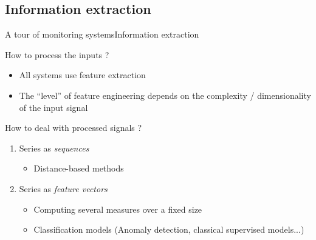 \documentclass[8pt,t,aspectratio=1610]{beamer}
\begin{document}
\subsection{Information extraction}
\begin{frame}{A tour of monitoring systems}{Information extraction}

    \begin{minipage}[t]{0.49\linewidth}
    \vspace{0pt}
    How to process the inputs ?
    \begin{itemize}
        \item All systems use feature extraction
        \item The ``level'' of feature engineering depends on the complexity / dimensionality of the input signal
    \end{itemize}
    How to deal with processed signals ?
    \begin{tcolorbox}[title=Time series classification]
        \begin{enumerate}
            \item Series as \emph{sequences}
            \begin{itemize}
                \item Distance-based methods
            \end{itemize}
            \item Series as \emph{feature vectors}
            \begin{itemize}
                \item Computing several measures over a fixed size
                \item Classification models
                (Anomaly detection, classical supervised models...)
            \end{itemize}
        \end{enumerate}
    \end{tcolorbox}
    \end{minipage}
    \hfill
    \begin{minipage}[t]{0.49\linewidth}
    \vspace{0pt}
        \begin{overprint}

\end{overprint}
\end{minipage}
\end{frame}
\end{document}
